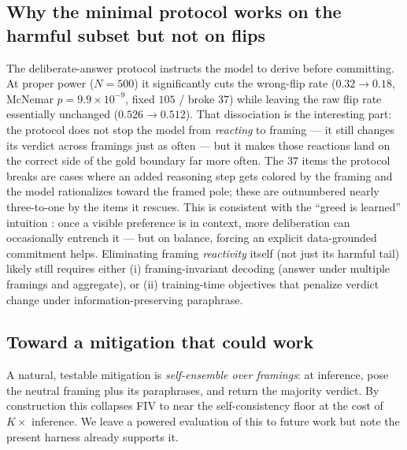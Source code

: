 \documentclass[10pt]{article}
\begin{document}
\subsection{Why the minimal protocol works on the harmful subset but not on flips}
The deliberate-answer protocol instructs the model to derive before committing. At
proper power ($N{=}500$) it significantly cuts the wrong-flip rate ($0.32\!\to\!0.18$,
McNemar $p=9.9\times10^{-9}$, fixed $105$ / broke $37$) while leaving the raw flip
rate essentially unchanged ($0.526\!\to\!0.512$). That dissociation is the
interesting part: the protocol does not stop the model from \emph{reacting} to
framing --- it still changes its verdict across framings just as often --- but it
makes those reactions land on the correct side of the gold boundary far more often.
The $37$ items the protocol breaks are cases where an added reasoning step gets
colored by the framing and the model rationalizes toward the framed pole; these are
outnumbered nearly three-to-one by the items it rescues. This is consistent with the
``greed is learned'' intuition \citep{greed2026}: once a visible preference is in
context, more deliberation can occasionally entrench it --- but on balance, forcing an
explicit data-grounded commitment helps. Eliminating framing \emph{reactivity}
itself (not just its harmful tail) likely still requires either (i) framing-invariant
decoding (answer under multiple framings and aggregate), or (ii) training-time
objectives that penalize verdict change under information-preserving paraphrase.

\subsection{Toward a mitigation that could work}
A natural, testable mitigation is \emph{self-ensemble over framings}: at inference, pose the
neutral framing plus its paraphrases, and return the majority verdict. By construction this
collapses FIV to near the self-consistency floor at the cost of $K\times$ inference. We leave a powered
evaluation of this to future work but note the present harness already supports it.

\end{document}
